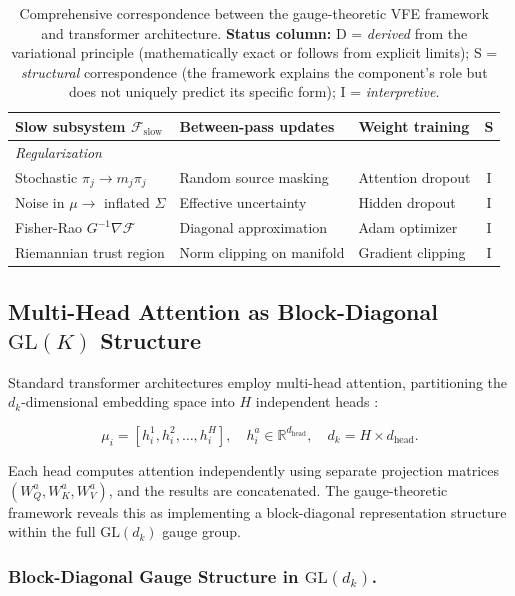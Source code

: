 \documentclass[twoside,11pt]{article}
\begin{document}
\begin{table}[p]
\begin{tabular}{|l|l|l|c|}
Slow subsystem $\mathcal{F}_{\text{slow}}$ & Between-pass updates & Weight training & S \\
\hline
\multicolumn{4}{|l|}{\textit{Regularization}} \\
\hline
Stochastic $\pi_j \to m_j\pi_j$ & Random source masking & Attention dropout & I \\
Noise in $\mu \to$ inflated $\Sigma$ & Effective uncertainty & Hidden dropout & I \\
Fisher-Rao $G^{-1}\nabla\mathcal{F}$ & Diagonal approximation & Adam optimizer & I \\
Riemannian trust region & Norm clipping on manifold & Gradient clipping & I \\
\hline
\end{tabular}
\caption{Comprehensive correspondence between the gauge-theoretic VFE framework and transformer architecture. \textbf{Status column:} D = \emph{derived} from the variational principle (mathematically exact or follows from explicit limits); S = \emph{structural} correspondence (the framework explains the component's role but does not uniquely predict its specific form); I = \emph{interpretive}.}
\label{tab:fep_nn_correspondence}
\end{table}


\subsection{Multi-Head Attention as Block-Diagonal $\mathrm{GL}(K)$ Structure}
\label{sec:multihead}

Standard transformer architectures employ multi-head attention, partitioning the $d_k$-dimensional embedding space into $H$ independent heads \citep{vaswani2017attention}:

\begin{equation}
\mu_i = [h_i^1, h_i^2, \ldots, h_i^H], \quad h_i^a \in \mathbb{R}^{d_{\text{head}}}, \quad d_k = H \times d_{\text{head}}.
\end{equation}

Each head computes attention independently using separate projection matrices $(W_Q^a, W_K^a, W_V^a)$, and the results are concatenated. The gauge-theoretic framework reveals this as implementing a block-diagonal representation structure within the full $\mathrm{GL}(d_k)$ gauge group.

\subsubsection{Block-Diagonal Gauge Structure in $\mathrm{GL}(d_k)$.}
\end{document}
